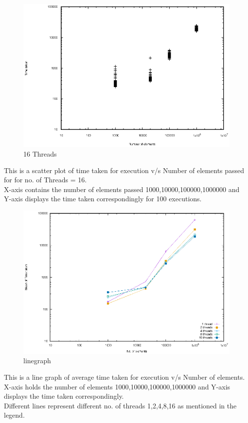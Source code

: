 \documentclass{article}
\begin{document}
\begin{figure}
\includegraphics[width=\linewidth]{scatter5.eps}
\caption{16 Threads}
\label{fig:Scatter5 graph}
\end{figure}
\noindent
This is a scatter plot of time taken for execution v/s Number of elements passed for for no. of Threads = 16. \\
X-axis contains the number of elements passed {1000,10000,100000,1000000} and Y-axis displays the time taken correspondingly for 100 executions.
\clearpage

\begin{figure}
\includegraphics[width=\linewidth]{mean.eps}
\caption{linegraph}
\label{fig:avg graph}
\end{figure}
\noindent
This is a line graph of average time taken for execution v/s Number of elements. \\
X-axis holds the number of elements {1000,10000,100000,1000000} and Y-axis displays the time taken correspondingly. \\
Different lines represent different no. of threads {1,2,4,8,16} as mentioned in the legend.
\end{document}
